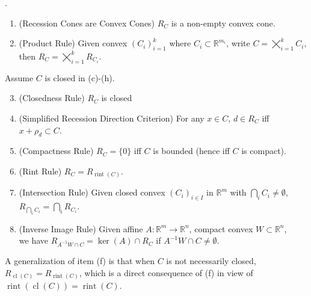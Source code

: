 \begin{prop}.
	\label{prop:013-yoga-recession}
	\begin{enumerate}[label=(\alph*)]
		\item (Recession Cones are Convex Cones) $R_C$ is a non-empty convex cone.
		\item (Product Rule) Given convex $(C_i)_{i=1}^k$ where $C_i\subset \mathbb{R}^{m_i}$, write $C=\bigtimes_{i=1}^kC_i$, then $R_C=\bigtimes_{i=1}^kR_{C_i}$.
	\end{enumerate}
	Assume $C$ is closed in (c)-(h).
	\begin{enumerate}[label=(\alph*)]
		\setcounter{enumi}{2}
		\item (Closedness Rule) $R_C$ is closed
		\item (Simplified Recession Direction Criterion) For any $x\in C$, $d\in R_C$ iff $x+\rho_d\subset C$.
		\item (Compactness Rule) $R_C=\{0\}$ iff $C$ is bounded (hence iff $C$ is compact).
		\item (Rint Rule) $R_C=R_{\operatorname{rint}(C)}$.
		\item (Intersection Rule) Given closed convex $(C_i)_{i\in I}$ in $\mathbb{R}^m$ with $\bigcap_i{C_i}\neq\emptyset$, $R_{\bigcap_iC_i}=\bigcap_iR_{C_i}$.
		\item (Inverse Image Rule) Given affine $A:\mathbb{R}^m\to \mathbb{R}^n$, compact convex $W\subset \mathbb{R}^n$,\\we have $R_{A^{-1}W\cap C}=\operatorname{ker}(A)\cap R_C$ if $A^{-1}W\cap C\neq\emptyset$.
	\end{enumerate}
\end{prop}

\begin{rmrk}
	A generalization of item (f) is that when $C$ is not necessarily closed, $R_{\operatorname{cl}(C)}=R_{\operatorname{rint}(C)}$, which is a direct consequence of (f) in view of $\operatorname{rint}(\operatorname{cl}(C))=\operatorname{rint}(C)$.
\end{rmrk}

